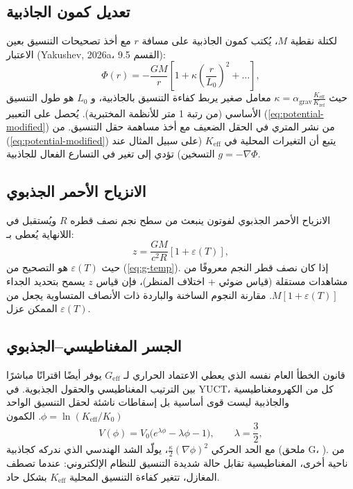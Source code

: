 \documentclass[11pt,a4paper]{article}
\newcommand{\Keff}{K_{\mathrm{eff}}}
\newcommand{\eps}{\varepsilon}
\begin{document}
	\subsection{تعديل كمون الجاذبية}
	\label{subsec:potential}
	
	لكتلة نقطية $M$، يُكتب كمون الجاذبية على مسافة $r$ مع أخذ تصحيحات التنسيق بعين الاعتبار (Yakushev, 2026a، القسم 9.5):
	\begin{equation}
		\Phi(r) = -\frac{GM}{r} \left[ 1 + \kappa \left( \frac{r}{L_0} \right)^2 + \dots \right],
		\label{eq:potential-modified}
	\end{equation}
	حيث $\kappa = \alpha_{\text{grav}} \frac{\Keff}{K_{\text{ref}}}$ معامل صغير يربط كفاءة التنسيق بالجاذبية، و $L_0$ هو طول التنسيق الأساسي (من رتبة 1 متر للأنظمة المختبرية). يُحصل على التعبير (\ref{eq:potential-modified}) من نشر المتري في الحقل الضعيف مع أخذ مساهمة حقل التنسيق. من (\ref{eq:potential-modified}) يتبع أن التغيرات المحلية في $\Keff$ (على سبيل المثال عند التسخين) تؤدي إلى تغير في التسارع الفعال للجاذبية $g = -\nabla \Phi$.
	
	\subsection{الانزياح الأحمر الجذبوي}
	\label{subsec:redshift}
	
	الانزياح الأحمر الجذبوي لفوتون ينبعث من سطح نجم نصف قطره $R$ ويُستقبل في اللانهاية يُعطى بـ:
	\begin{equation}
		z = \frac{GM}{c^2 R} \left[ 1 + \eps(T) \right],
		\label{eq:redshift}
	\end{equation}
	حيث $\eps(T)$ هو التصحيح من (\ref{eq:g-temp}). إذا كان نصف قطر النجم معروفًا من مشاهدات مستقلة (قياس ضوئي + اختلاف المنظر)، فإن قياس $z$ يسمح بتحديد الجداء $M[1+\eps(T)]$. مقارنة النجوم الساخنة والباردة ذات الأنصاف المتساوية يجعل من الممكن عزل $\eps(T)$.
	
	\subsection{الجسر المغناطيسي–الجذبوي}
	\label{subsec:magnetism-gravity}
	
	قانون الخطأ العام نفسه الذي يعطي الاعتماد الحراري لـ $G_{\mathrm{eff}}$ يوفر أيضًا اقترانًا مباشرًا بين الترتيب المغناطيسي والحقول الجذبوية. في YUCT، كل من الكهرومغناطيسية والجاذبية ليست قوى أساسية بل إسقاطات ناشئة لحقل التنسيق الواحد $\phi = \ln(\Keff/K_0)$. الكمون
	\begin{equation}
		V(\phi) = V_0\bigl(e^{\lambda\phi} - \lambda\phi - 1\bigr), \qquad \lambda = \frac{3}{2},
	\end{equation}
	مع الحد الحركي $\frac{\kappa}{2}(\nabla\phi)^2$، يولّد الشد الهندسي الذي ندركه كجاذبية (ملحق G، \cite{AppendixG}). من ناحية أخرى، المغناطيسية تقابل حالة شديدة التنسيق للنظام الإلكتروني: عندما تصطف المغازل، تتغير كفاءة التنسيق المحلية $\Keff$ بشكل حاد.
	
\end{document}
